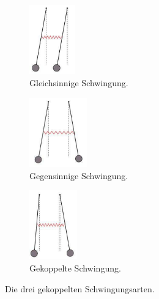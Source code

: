 \begin{figure}[h]
	\begin{subfigure}[b]{.33\linewidth}
	\centering
	\includegraphics[height=3cm, keepaspectratio]{bilder/gleichsinnig.pdf}
	\caption{Gleichsinnige Schwingung.}\label{fig:gleich}
	\end{subfigure}%
	\begin{subfigure}[b]{.33\linewidth}
	\centering
	\includegraphics[height=3cm, keepaspectratio]{bilder/gegensinnig.pdf}
	\caption{Gegensinnige Schwingung.}\label{fig:gegen}
	\end{subfigure}
	\begin{subfigure}[b]{.33\linewidth}
	\centering
	\includegraphics[height=3cm, keepaspectratio]{bilder/gekoppelt.pdf}
	\caption{Gekoppelte Schwingung.}\label{fig:gekoppelt}
	\end{subfigure}
	\caption{Die drei gekoppelten Schwingungsarten. \cite{anleitung}}
	\label{fig:Schwingungen}
	\end{figure}